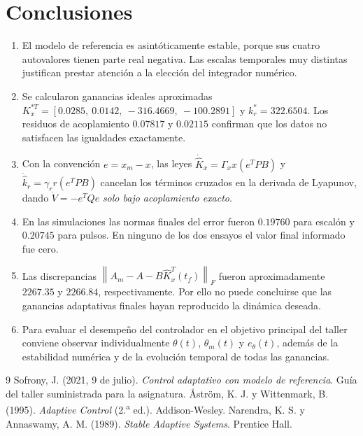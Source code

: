 \documentclass[conference,letterpaper]{IEEEtran}
\newcommand{\norm}[1]{\left\lVert #1\right\rVert}
\begin{document}
\section{Conclusiones}
\begin{enumerate}[leftmargin=*,itemsep=5pt]
\item El modelo de referencia es asintóticamente estable, porque sus cuatro autovalores tienen parte real negativa. Las escalas temporales muy distintas justifican prestar atención a la elección del integrador numérico.
\item Se calcularon ganancias ideales aproximadas $K_x^{*T}=[0.0285,\ 0.0142,\ -316.4669,\ -100.2891]$ y $k_r^*=322.6504$. Los residuos de acoplamiento $0.07817$ y $0.02115$ confirman que los datos no satisfacen las igualdades exactamente.
\item Con la convención $e=x_m-x$, las leyes $\dot{\hat K}_x=\Gamma_xx(e^TPB)$ y $\dot{\hat k}_r=\gamma_rr(e^TPB)$ cancelan los términos cruzados en la derivada de Lyapunov, dando $\dot V=-e^TQe$ \emph{solo bajo acoplamiento exacto}.
\item En las simulaciones las normas finales del error fueron $0.19760$ para escalón y $0.20745$ para pulsos. En ninguno de los dos ensayos el valor final informado fue cero.
\item Las discrepancias $\norm{A_m-A-B\hat K_x^T(t_f)}_F$ fueron aproximadamente $2267.35$ y $2266.84$, respectivamente. Por ello no puede concluirse que las ganancias adaptativas finales hayan reproducido la dinámica deseada.
\item Para evaluar el desempeño del controlador en el objetivo principal del taller conviene observar individualmente $\theta(t)$, $\theta_m(t)$ y $e_\theta(t)$, además de la estabilidad numérica y de la evolución temporal de todas las ganancias.
\end{enumerate}

\begin{thebibliography}{9}
Sofrony, J. (2021, 9 de julio).
\textit{Control adaptativo con modelo de referencia}.
Guía del taller suministrada para la asignatura.
Åström, K. J. y Wittenmark, B. (1995).
\textit{Adaptive Control} (2.\textsuperscript{a} ed.). Addison-Wesley.
Narendra, K. S. y Annaswamy, A. M. (1989).
\textit{Stable Adaptive Systems}. Prentice Hall.
\end{thebibliography}
\end{document}

